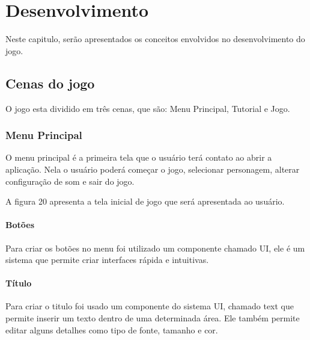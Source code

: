 \chapter{Desenvolvimento}
\label{cap:desenvolvimento}

Neste capitulo, serão apresentados os conceitos envolvidos no desenvolvimento do jogo.

\section{Cenas do jogo}
O jogo esta dividido em três cenas, que são: Menu Principal, Tutorial e Jogo.

\subsection{Menu Principal}
O menu principal é a primeira tela que o usuário terá contato ao abrir a aplicação. Nela o usuário poderá começar o jogo, selecionar personagem, alterar configuração de som e sair do jogo.

A figura 20 apresenta a tela inicial de jogo que será apresentada ao usuário.

\begin{figure}[h!]
		\centering
	\end{figure}
	
\subsubsection{Botões}
Para criar os botões no menu foi utilizado um componente chamado UI, ele é um sistema que permite criar interfaces rápida e intuitivas. 

\subsubsection{Título }
Para criar o titulo foi usado um componente do sistema UI, chamado text que permite inserir um texto dentro de uma determinada área. Ele também permite editar alguns detalhes como tipo de fonte, tamanho e cor.

